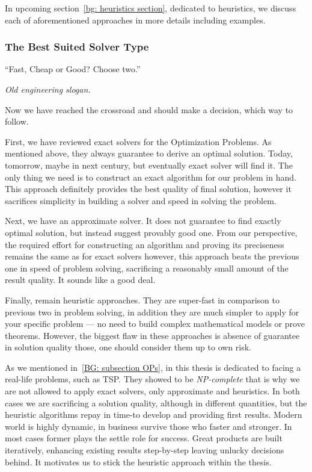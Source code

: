 In upcoming section~\ref{bg: heuristics section}, dedicated to heuristics, we discuss each of aforementioned approaches in more details including examples.


\subsubsection{The Best Suited Solver Type}
\epigraph{``Fast, Cheap or Good? Choose two.''}{\textit{Old engineering slogan.}}

Now we have reached the crossroad and should make a decision, which way to follow.

First, we have reviewed exact solvers for the Optimization Problems. As mentioned above, they always guarantee to derive an optimal solution. Today, tomorrow, maybe in next century, but eventually exact solver will find it. The only thing we need is to construct an exact algorithm for our problem in hand. This approach definitely provides the best quality of final solution, however it sacrifices simplicity in building a solver and speed in solving the problem.

Next, we have an approximate solver. It does not guarantee to find exactly optimal solution, but instead suggest provably good one. From our perspective, the required effort for constructing an algorithm and proving its preciseness remains the same as for exact solvers however, this approach beats the previous one in speed of problem solving, sacrificing a reasonably small amount of the result quality. It sounds like a good deal.

Finally, remain heuristic approaches. They are super-fast in comparison to previous two in problem solving, in addition they are much simpler to apply for your specific problem — no need to build complex mathematical models or prove theorems. However, the biggest flaw in these approaches is absence of guarantee in solution quality those, one should consider them up to own risk.


As we mentioned in~\ref{BG: subsection OPs}, in this thesis is dedicated to facing a real-life problems, such as TSP. They showed to be \textit{NP-complete} that is why we are not allowed to apply exact solvers, only approximate and heuristics. In both cases we are sacrificing a solution quality, although in different quantities, but the heuristic algorithms repay in time-to develop and providing first results. Modern world is highly dynamic, in business survive those who faster and stronger. In most cases former plays the settle role for success. Great products are built iteratively, enhancing existing results step-by-step leaving unlucky decisions behind. It motivates us to stick the heuristic approach within the thesis.

